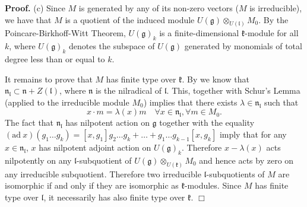 \documentclass[12pt]{report}
\newenvironment{proof}[1][]{ \textbf{Proof#1. }}{$\Box$\medskip}
\newcommand{\kk}{\mathfrak{k}}
\newcommand{\nn}{\mathfrak{n}}
\newcommand{\gG}{\mathfrak{g}}
\newcommand{\lL}{\mathfrak{l}}
\newcommand{\ad}{\mathrm{ad~}}
\begin{document}
\begin{proof}
(c) Since $M$ is generated by any of its non-zero vectors ($M$ is irreducible), we have that $M$ is a quotient of the induced module $U(\gG)\otimes_{U(\lL)}M_0$. By the Poincare-Birkhoff-Witt Theorem, $U(\gG)_k$ is a finite-dimensional  $\kk$-module for all $k$, where $U(\gG)_k$ denotes the subspace of $U(\gG)$ generated by monomials of total degree less than or equal to $k$. 

It remains to prove that $M$ has finite type over $\kk$. By \cite[Ch.1 par. 6.8]{Bourbaki} we know that $\nn_\lL\subset \nn+ Z(\lL)$, where $\nn$ is the nilradical of $\lL$. This, together with Schur's Lemma (applied to the irreducible module $M_0$) implies that there exists $\lambda\in\nn_\lL$ such that 
\[x\cdot m=\lambda(x)m\quad \forall x\in\nn_\lL, \forall m\in M_0.\]
The fact that $\nn_\lL$ has nilpotent action on $\gG$ together with the equality $(\ad x) ( g_1\dots g_k)=[ x,g_1]g_2\dots g_k+\dots+ g_1\dots  g_{k-1}[ x,g_k]$ imply that for any $x\in\nn_\lL$, $x$  has nilpotent adjoint action on $U(\gG)_k$. Therefore $x-\lambda(x)$ acts nilpotently on any $\lL$-subquotient of $U(\gG)\otimes_{U(\kk)}M_0$ and hence acts by zero on any irreducible subquotient. Therefore two irreducible $\lL$-subquotients of $M$ are isomorphic if and only if they are isomorphic as $\kk$-modules. Since $M$ has finite type over $\lL$, it necessarily has also finite type over $\kk$.
\end{proof}
\end{document}

